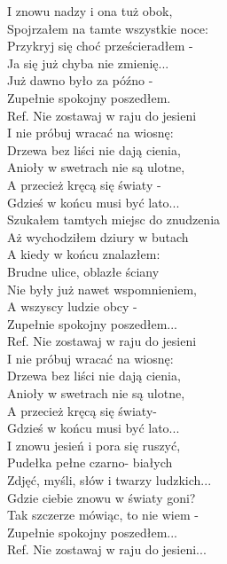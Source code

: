 
I znowu nadzy i ona tuż obok, \tab{} \\
Spojrzałem na tamte wszystkie noce: \\
Przykryj się choć prześcieradłem -\\
Ja się już chyba nie zmienię... \tab{}\\
Już dawno było za późno - \tab{}\\
Zupełnie spokojny poszedłem. \tab{}\\
\hops
Ref. Nie zostawaj w raju do jesieni \\
 I nie próbuj wracać na wiosnę: \\
 Drzewa bez liści nie dają cienia, \\
 Anioły w swetrach nie są ulotne, \\
 A przecież kręcą się światy - \\
 Gdzieś w końcu musi być lato... \\
\hops
Szukałem tamtych miejsc do znudzenia \\
Aż wychodziłem dziury w butach \\
A kiedy w końcu znalazłem: \\
Brudne ulice, oblazłe ściany \\
Nie były już nawet wspomnieniem, \\
A wszyscy ludzie obcy - \\
Zupełnie spokojny poszedłem... \\
\hops
Ref. Nie zostawaj w raju do jesieni\\
 I nie próbuj wracać na wiosnę: \\
 Drzewa bez liści nie dają cienia, \\
 Anioły w swetrach nie są ulotne, \\
 A przecież kręcą się światy- \\
 Gdzieś w końcu musi być lato... \\
\hops
I znowu jesień i pora się ruszyć, \\
Pudełka pełne czarno- białych \\
Zdjęć, myśli, słów i twarzy ludzkich... \\
Gdzie ciebie znowu w światy goni? \\
Tak szczerze mówiąc, to nie wiem - \\
Zupełnie spokojny poszedłem...  \\
\hops
Ref. Nie zostawaj w raju do jesieni...